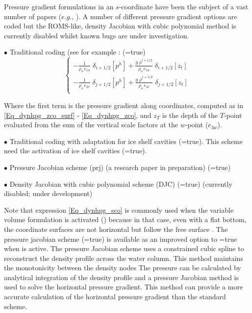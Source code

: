 Pressure gradient formulations in an $s$-coordinate have been the subject of a vast 
number of papers ($e.g.$, \citet{Song1998, Shchepetkin_McWilliams_OM05}). 
A number of different pressure gradient options are coded but the ROMS-like, density Jacobian with 
cubic polynomial method is currently disabled whilst known bugs are under investigation.

$\bullet$ Traditional coding (see for example \citet{Madec_al_JPO96}: (=true)
\begin{equation} \label{Eq_dynhpg_sco}
\left\{ \begin{aligned}
 - \frac{1}    					{\rho_o \, e_{1u}} \;	\delta _{i+1/2} \left[  p^h  \right] 
+ \frac{g\; \overline {\rho}^{i+1/2}}	{\rho_o \, e_{1u}} \;	\delta _{i+1/2} \left[  z_t   \right]    \\
 - \frac{1}    					{\rho_o \, e_{2v}} \;	\delta _{j+1/2} \left[  p^h  \right]  
+ \frac{g\; \overline {\rho}^{j+1/2}}	{\rho_o \, e_{2v}} \;	\delta _{j+1/2} \left[  z_t   \right]    \\
\end{aligned} \right.
\end{equation} 

Where the first term is the pressure gradient along coordinates, computed as in 
\eqref{Eq_dynhpg_zco_surf} - \eqref{Eq_dynhpg_zco}, and $z_T$ is the depth of 
the $T$-point evaluated from the sum of the vertical scale factors at the $w$-point 
($e_{3w}$).
 
$\bullet$ Traditional coding with adaptation for ice shelf cavities (=true).
This scheme need the activation of ice shelf cavities (=true).

$\bullet$ Pressure Jacobian scheme (prj) (a research paper in preparation) (=true)

$\bullet$ Density Jacobian with cubic polynomial scheme (DJC) \citep{Shchepetkin_McWilliams_OM05} 
(=true) (currently disabled; under development)

Note that expression \eqref{Eq_dynhpg_sco} is commonly used when the variable volume formulation is
activated () because in that case, even with a flat bottom, the coordinate surfaces are not
horizontal but follow the free surface \citep{Levier2007}. The pressure jacobian scheme
(=true) is available as an improved option to =true when
 is active.  The pressure Jacobian scheme uses a constrained cubic spline to reconstruct
the density profile across the water column. This method maintains the monotonicity between the
density nodes  The pressure can be calculated by analytical integration of the density profile and a
pressure Jacobian method is used to solve the horizontal pressure gradient. This method can provide
a more accurate calculation of the horizontal pressure gradient than the standard scheme.

